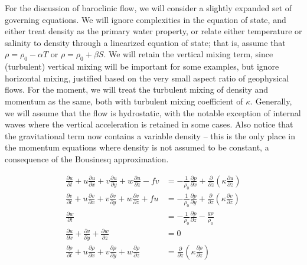 \documentclass[11pt]{report}
\numberwithin{equation}{section}
\begin{document}
For the discussion of baroclinic flow, we will consider a slightly expanded set of governing equations.  We will ignore complexities in the equation of state, and either treat density as the primary water property, or relate either temperature or salinity to density through a linearized equation of state; that is, assume that $\rho=\rho_0 - \alpha T$ or $\rho=\rho_0 + \beta S$.  We will retain the vertical mixing term, since (turbulent) vertical mixing will be important for some examples, but ignore horizontal mixing, justified based on the very small aspect ratio of geophysical flows.  For the moment, we will treat the turbulent mixing of density and momentum as the same, both with turbulent mixing coefficient of $\kappa$.  Generally, we will assume that the flow is hydrostatic, with the notable exception of internal waves where the vertical acceleration is retained in some cases.  Also notice that the gravitational term now contains a variable density -- this is the only place in the momentum equations where density is not assumed to be constant, a consequence of the Bousinesq approximation.

\begin{align}
    \frac{\partial u}{\partial t} 
        + u\frac{\partial u}{\partial x} 
        + v\frac{\partial u}{\partial y} 
        + w\frac{\partial u}{\partial z} - fv 
                &= -\frac{1}{\rho_0}\frac{\partial p}{\partial x} 
                   +\frac{\partial}{\partial z}\left( 
                        \kappa \frac{\partial u}{\partial z}
                        \right) \label{eq:u-baroclinic} \\
    \frac{\partial v}{\partial t} 
        + u\frac{\partial v}{\partial x} 
        + v\frac{\partial v}{\partial y} 
        + w\frac{\partial v}{\partial z} + fu 
                &= -\frac{1}{\rho_0}\frac{\partial p}{\partial y}
                   +\frac{\partial}{\partial z}\left( 
                        \kappa \frac{\partial v}{\partial z}
                        \right)  \label{eq:v-baroclinic} \\
    \frac{\partial w}{\partial t}  
                &= -\frac{1}{\rho_0}\frac{\partial p}{\partial z} 
                   -\frac{g \rho}{\rho_0} \label{eq:w-baroclinic} \\
    \frac{\partial u}{\partial x} 
        + \frac{\partial v}{\partial y} 
        + \frac{\partial w}{\partial z} 
                &= 0 \label{eq:cont-baroclinic}\\
    \frac{\partial \rho}{\partial t} 
        + u\frac{\partial \rho}{\partial x} 
        + v\frac{\partial \rho}{\partial y} 
        + w\frac{\partial \rho}{\partial z}
                &= \frac{\partial}{\partial z}\left( 
                        \kappa \frac{\partial \rho}{\partial z}
                        \right)
\end{align}
\end{document}

